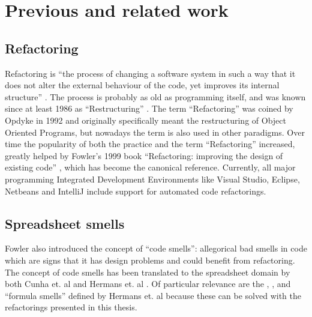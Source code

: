 
\chapter{Previous and related work}
\label{chapter:previouswork}

\section{Refactoring}

Refactoring is ``the process of changing a software system in such a way that it does not alter the external behaviour of the code, yet improves its internal structure'' \cite{opdyke1992refactoring}.
The process is probably as old as programming itself, and was known since at least 1986 as ``Restructuring'' \cite{arnold1986introduction}.
The term ``Refactoring'' was coined by Opdyke in 1992 \cite{opdyke1992refactoring} and originally specifically meant the restructuring of Object Oriented Programs, but nowadays the term is also used in other paradigms.
Over time the popularity of both the practice and the term ``Refactoring'' increased, greatly helped by Fowler's 1999 book ``Refactoring: improving the design of existing code'' \cite{fowler1999refactoring}, which has become the canonical reference.
Currently, all major programming Integrated Development Environments like Visual Studio, Eclipse, Netbeans and IntelliJ include support for automated code refactorings.

\section{Spreadsheet smells}

Fowler \cite{fowler1999refactoring} also introduced the concept of ``code smells'': allegorical bad smells in code which are signs that it has design problems and could benefit from refactoring.
The concept of code smells has been translated to the spreadsheet domain by both Cunha et. al \cite{cunha2012towards} and Hermans et. al \cite{hermans2012detecting, DBLP:conf/icsm/Hermans212, hermans2014detecting}.
Of particular relevance are the , ,  and  ``formula smells'' defined by Hermans et. al \cite{DBLP:conf/icsm/Hermans212,hermans2014detecting} because these can be solved with the refactorings presented in this thesis.

